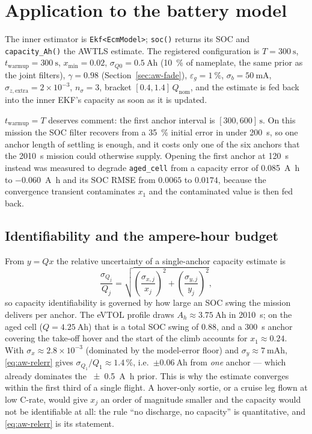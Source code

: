 \section{Application to the battery model}
The inner estimator is \texttt{Ekf<EcmModel>}; \texttt{soc()} returns its SOC and
\texttt{capacity\_Ah()} the AWTLS estimate.  The registered configuration is
$T=\SI{300}{\second}$, $t_\text{warmup}=\SI{300}{\second}$, $x_{\min}=0.02$,
$\sigma_{Q0}=\SI{0.5}{\ampere\hour}$ (\SI{10}{\percent} of nameplate, the same prior as the joint
filters), $\gamma=0.98$ (Section~\ref{sec:aw-fade}), $\varepsilon_g=\SI{1}{\percent}$, $\sigma_b=\SI{50}{\milli\ampere}$,
$\sigma_{z,\text{extra}}=2\times10^{-3}$, $n_\sigma=3$, bracket $[0.4,1.4]\,Q_\text{nom}$, and the
estimate is fed back into the inner EKF's capacity as soon as it is updated.

$t_\text{warmup}=T$ deserves comment: the first anchor interval is $[300,600]\,\si{\second}$.  On
this mission the SOC filter recovers from a \SI{35}{\percent} initial error in under
\SI{200}{\second}, so one anchor length of settling is enough, and it costs only one of the six
anchors that the \SI{2010}{\second} mission could otherwise supply.  Opening the first anchor at
\SI{120}{\second} instead was measured to degrade \texttt{aged\_cell} from a capacity error of
\SI{+0.085}{\ampere\hour} to \SI{-0.060}{\ampere\hour} and its SOC RMSE from $0.0065$ to $0.0174$,
because the convergence transient contaminates $x_1$ and the contaminated value is then fed back.

\subsection{Identifiability and the ampere-hour budget}
\label{sec:aw-ident}
From $y=Qx$ the relative uncertainty of a single-anchor capacity estimate is
\begin{equation}
\frac{\sigma_{Q_j}}{Q_j}=\sqrt{\left(\frac{\sigma_{x,j}}{x_j}\right)^2+\left(\frac{\sigma_{y,j}}{y_j}\right)^2},
\label{eq:aw-relerr}
\end{equation}
so capacity identifiability is governed by how large an SOC swing the mission delivers per anchor.
The eVTOL profile draws $A_h\approx\SI{3.75}{\ampere\hour}$ in \SI{2010}{\second}; on the aged cell
($Q=\SI{4.25}{\ampere\hour}$) that is a total SOC swing of $0.88$, and a \SI{300}{\second} anchor
covering the take-off hover and the start of the climb accounts for $x_1\approx0.24$.  With
$\sigma_x\approx2.8\times10^{-3}$ (dominated by the model-error floor) and
$\sigma_y\approx\SI{7}{\milli\ampere\hour}$, \eqref{eq:aw-relerr} gives
$\sigma_{Q_1}/Q_1\approx1.4\,\%$, i.e.\ $\pm\SI{0.06}{\ampere\hour}$ from \emph{one} anchor --- which
already dominates the \SI{\pm0.5}{\ampere\hour} prior.  This is why the estimate converges within the
first third of a single flight.  A hover-only sortie, or a cruise leg flown at low C-rate, would
give $x_j$ an order of magnitude smaller and the capacity would not be identifiable at all: the rule
``no discharge, no capacity'' is quantitative, and \eqref{eq:aw-relerr} is its statement.

